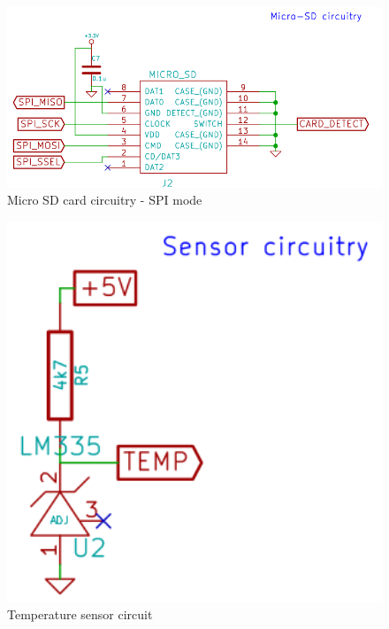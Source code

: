\documentclass{article}
\begin{document}
\begin{figure}[H]
\centering
\includegraphics[width=140mm,angle=0]{../images/sd_card.png}
\caption{Micro SD card circuitry - SPI mode}
\label{}
\end{figure}

\begin{figure}[H]
\centering
\includegraphics[width=140mm,angle=0]{../images/temp.png}
\caption{Temperature sensor circuit}
\label{}
\end{figure}
\end{document}
